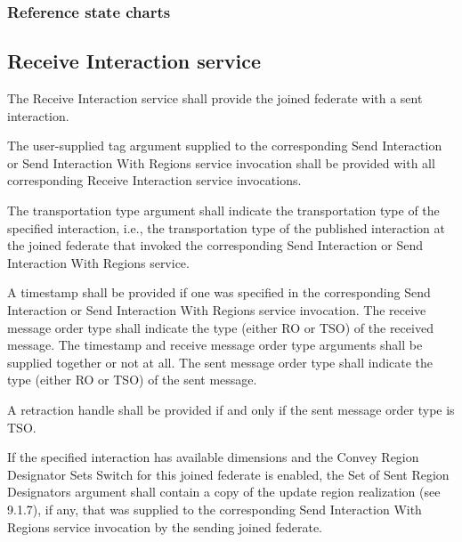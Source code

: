 \begin{compactstdpage}


    \subsubsection{Reference state charts}



    \subsection{Receive Interaction \rtiinitiated{} service}


    The Receive Interaction \rtiinitiated{} service shall provide the joined federate with a sent interaction.


    The user-supplied tag argument supplied to the corresponding Send Interaction or Send Interaction With Regions service invocation shall be provided with all corresponding Receive Interaction \rtiinitiated{} service invocations.


    The transportation type argument shall indicate the transportation type of the specified interaction, i.e., the transportation type of the published interaction at the joined federate that invoked the corresponding Send Interaction or Send Interaction With Regions service.


    A timestamp shall be provided if one was specified in the corresponding Send Interaction or Send Interaction With Regions service invocation. The receive message order type shall indicate the type (either RO or TSO) of the received message. The timestamp and receive message order type arguments shall be supplied together or not at all. The sent message order type shall indicate the type (either RO or TSO) of the sent message.


    A retraction handle shall be provided if and only if the sent message order type is TSO.


    If the specified interaction has available dimensions and the Convey Region Designator Sets Switch for this joined federate is enabled, the Set of Sent Region Designators argument shall contain a copy of the update region realization (see 9.1.7), if any, that was supplied to the corresponding Send Interaction With Regions service invocation by the sending joined federate.



\end{compactstdpage}
